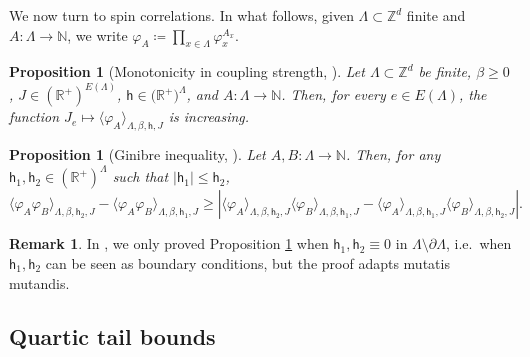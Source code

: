 \documentclass[11pt,a4paper]{article}
\newtheorem{proposition}[theorem]{Proposition}
\theoremstyle{definition}
\newtheorem{remark}[theorem]{Remark}
\numberwithin{equation}{section}
\newcommand\N{\mathbb{N}}
\begin{document}
We now turn to spin correlations. In what follows, given $\Lambda\subset\mathbb{Z}^d$ finite and $A:\Lambda\rightarrow \mathbb{N}$, we write $\varphi_A\coloneqq \prod_{x\in \Lambda} \varphi_x^{A_x}$.


\begin{proposition}[Monotonicity in coupling strength, {\cite[Proposition 3.18 and Remark 3.19]{GunaratnamPanagiotisPanisSeveroPhi42022}}] \label{prop:monotonicity}
Let $\Lambda \subset \mathbb Z^d$ be finite, $\beta\geq0$, $J\in (\mathbb R^+)^{E(\Lambda)}$, $\mathsf{h}\in \mathbb (\mathbb R^+)^\Lambda$, and $A: \Lambda\to \N$. Then, for every $e\in E(\Lambda)$, the function
$J_e\mapsto \langle \varphi_A\rangle_{\Lambda,\beta,\mathsf{h},J}$ is increasing.
\end{proposition}

\begin{proposition}[Ginibre inequality, {\cite[Proposition~2.11]{GunaratnamPanagiotisPanisSeveroPhi42022}}]\label{prop:Ginibre} Let $A,B: \Lambda\rightarrow \N$. Then, for any $\mathsf{h}_1, \mathsf{h}_2\in (\mathbb R^+)^\Lambda$ such that $|\mathsf{h}_1|\leq \mathsf{h}_2$,
\begin{equation}\label{eq:Ginibre}
    \langle \varphi_A\varphi_B\rangle_{\Lambda,\beta,\mathsf{h}_2,J}-\langle \varphi_A\varphi_B\rangle_{\Lambda,\beta,\mathsf{h}_1,J}\geq \left|\langle \varphi_A\rangle_{\Lambda,\beta,\mathsf{h}_2,J}\langle \varphi_B\rangle_{\Lambda,\beta,\mathsf{h}_1,J}-\langle \varphi_A\rangle_{\Lambda,\beta,\mathsf{h}_1,J}\langle\varphi_B\rangle_{\Lambda,\beta,\mathsf{h}_2,J}\right|.
\end{equation}
\end{proposition}

\begin{remark} 
In \textup{\cite{GunaratnamPanagiotisPanisSeveroPhi42022}}, we only proved Proposition \textup{\ref{prop:Ginibre}} when $\mathsf{h}_1,\mathsf{h}_2\equiv 0$ in $\Lambda\setminus \partial \Lambda$, i.e.\ when $\mathsf{h}_1,\mathsf{h}_2$ can be seen as boundary conditions, but the proof adapts mutatis mutandis. 
\end{remark}



\subsection{Quartic tail bounds}\label{sec:regularity}
\end{document}
